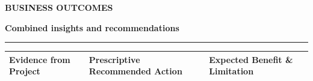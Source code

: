 \documentclass[aspectratio=169, 10pt]{beamer}
\newcommand{\slideheader}[3]{%
        \vspace{-0.25cm}%
        \noindent\begin{minipage}[t]{0.88\linewidth}%
            {\fontsize{7pt}{8.5pt}\selectfont \textbf{\color{BlueAccent}#1}}\par\vspace{1pt}%
            {\fontsize{11.5pt}{13.5pt}\selectfont \textbf{\color{NavyPrimary}#2}}%
        \end{minipage}%
        \hfill%
        \begin{minipage}[t]{0.10\linewidth}%
            \raggedleft{\fontsize{12pt}{14pt}\selectfont \textbf{\color{CoralAccent}#3}}%
        \end{minipage}\par%
        \vspace{2pt}%
        \textcolor{CardBorder}{\rule{\linewidth}{0.6pt}}\par%
        \vspace{3pt}%
    }
\begin{document}
    \begin{frame}[t]                                                                                                                                                                                   
        \slideheader{BUSINESS OUTCOMES}{Combined insights and recommendations}{14}                                                                                                                     
        \vspace{-0.1cm}                                                                                                                                                                                
        \begin{table}[h]                                                                                                                                                                               
            \centering\scriptsize                                                                                                                                                                      
            \begin{tabular}{p{3.8cm}p{4.5cm}p{4.5cm}}                                                                                                                                                  
                \toprule                                                                                                                                                                               
                \rowcolor{NavyPrimary!15} \textbf{Evidence from Project} & \textbf{Prescriptive Recommended Action} & \textbf{Expected Benefit \& Limitation} \\                                       
                \midrule                                                                                                                                                                               

\end{tabular}
\end{table}
\end{frame}
\end{document}
